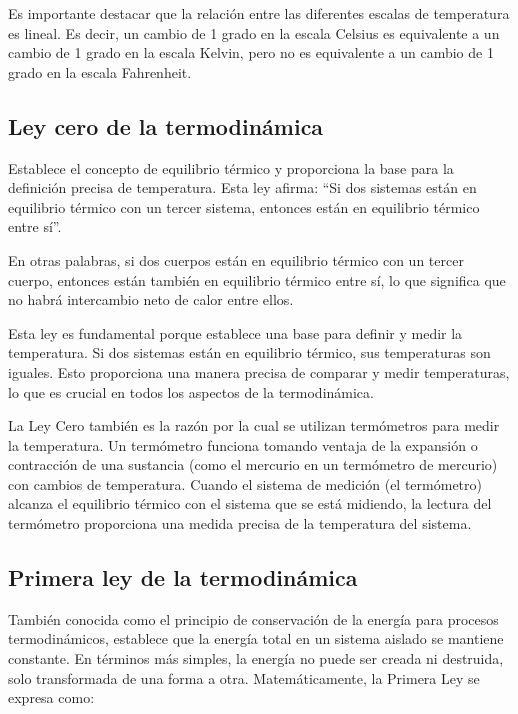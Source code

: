 \documentclass[letterpaper, 12pt]{article}
\begin{document}
Es importante destacar que la relación entre las diferentes
escalas de temperatura es lineal. Es decir, un cambio de 1
grado en la escala Celsius es equivalente a un cambio de 1
grado en la escala Kelvin, pero no es equivalente a un
cambio de 1 grado en la escala Fahrenheit.

\subsection{Ley cero de la termodinámica}

Establece el concepto de equilibrio térmico y proporciona
la base para la definición precisa de temperatura. Esta ley
afirma: ``Si dos sistemas están en equilibrio térmico con
un tercer sistema, entonces están en equilibrio térmico
entre sí''.

En otras palabras, si dos cuerpos están en equilibrio
térmico con un tercer cuerpo, entonces están también en
equilibrio térmico entre sí, lo que significa que no habrá
intercambio neto de calor entre ellos.

Esta ley es fundamental porque establece una base para
definir y medir la temperatura. Si dos sistemas están en
equilibrio térmico, sus temperaturas son iguales. Esto
proporciona una manera precisa de comparar y medir
temperaturas, lo que es crucial en todos los aspectos de la
termodinámica.

La Ley Cero también es la razón por la cual se utilizan
termómetros para medir la temperatura. Un termómetro
funciona tomando ventaja de la expansión o contracción de
una sustancia (como el mercurio en un termómetro de
mercurio) con cambios de temperatura. Cuando el sistema de
medición (el termómetro) alcanza el equilibrio térmico con
el sistema que se está midiendo, la lectura del termómetro
proporciona una medida precisa de la temperatura del
sistema.

\subsection{Primera ley de la termodinámica}

También conocida como el principio de conservación de la
energía para procesos termodinámicos, establece que la
energía total en un sistema aislado se mantiene constante.
En términos más simples, la energía no puede ser creada ni
destruida, solo transformada de una forma a otra.
Matemáticamente, la Primera Ley se expresa como:
\end{document}
